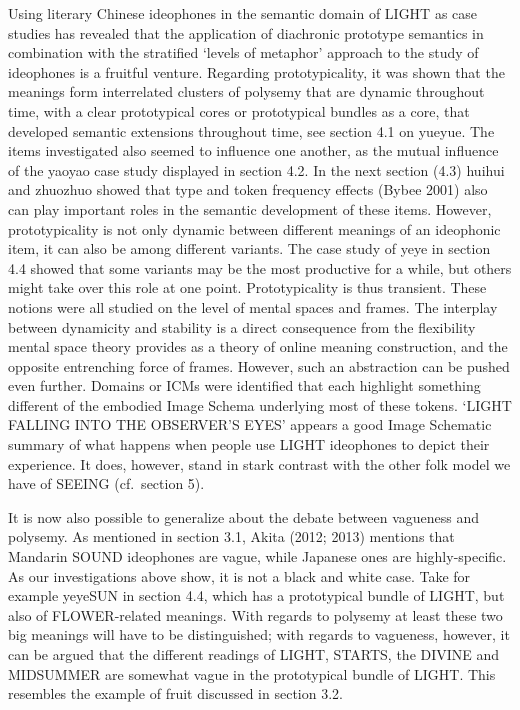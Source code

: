 \documentclass[12pt,article,oneside]{memoir}
\theoremstyle{definition}
\theoremstyle{definition}
\theoremstyle{definition}
\theoremstyle{remark}
\begin{document}
Using literary Chinese ideophones in the semantic domain of LIGHT as
case studies has revealed that the application of diachronic prototype
semantics in combination with the stratified `levels of metaphor'
approach to the study of ideophones is a fruitful venture. Regarding
prototypicality, it was shown that the meanings form interrelated
clusters of polysemy that are dynamic throughout time, with a clear
prototypical cores or prototypical bundles as a core, that developed
semantic extensions throughout time, see section 4.1 on yueyue. The
items investigated also seemed to influence one another, as the mutual
influence of the yaoyao case study displayed in section 4.2. In the next
section (4.3) huihui and zhuozhuo showed that type and token frequency
effects (Bybee 2001) also can play important roles in the semantic
development of these items. However, prototypicality is not only dynamic
between different meanings of an ideophonic item, it can also be among
different variants. The case study of yeye in section 4.4 showed that
some variants may be the most productive for a while, but others might
take over this role at one point. Prototypicality is thus transient.
These notions were all studied on the level of mental spaces and frames.
The interplay between dynamicity and stability is a direct consequence
from the flexibility mental space theory provides as a theory of online
meaning construction, and the opposite entrenching force of frames.
However, such an abstraction can be pushed even further. Domains or ICMs
were identified that each highlight something different of the embodied
Image Schema underlying most of these tokens. `LIGHT FALLING INTO THE
OBSERVER'S EYES' appears a good Image Schematic summary of what happens
when people use LIGHT ideophones to depict their experience. It does,
however, stand in stark contrast with the other folk model we have of
SEEING (cf.~section 5).

It is now also possible to generalize about the debate between vagueness
and polysemy. As mentioned in section 3.1, Akita (2012; 2013) mentions
that Mandarin SOUND ideophones are vague, while Japanese ones are
highly-specific. As our investigations above show, it is not a black and
white case. Take for example yeyeSUN in section 4.4, which has a
prototypical bundle of LIGHT, but also of FLOWER-related meanings. With
regards to polysemy at least these two big meanings will have to be
distinguished; with regards to vagueness, however, it can be argued that
the different readings of LIGHT, STARTS, the DIVINE and MIDSUMMER are
somewhat vague in the prototypical bundle of LIGHT. This resembles the
example of fruit discussed in section 3.2.
\end{document}
